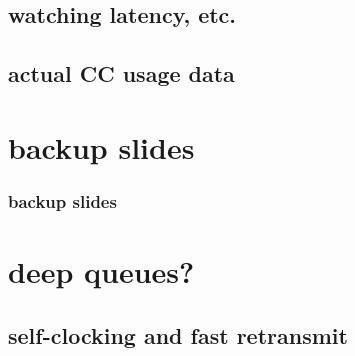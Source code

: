 \subsection{watching latency, etc.}


\subsection{actual CC usage data}





\section{backup slides}
\begin{frame}\frametitle{backup slides}
\end{frame}
\section{deep queues?}


\subsection{self-clocking and fast retransmit}



